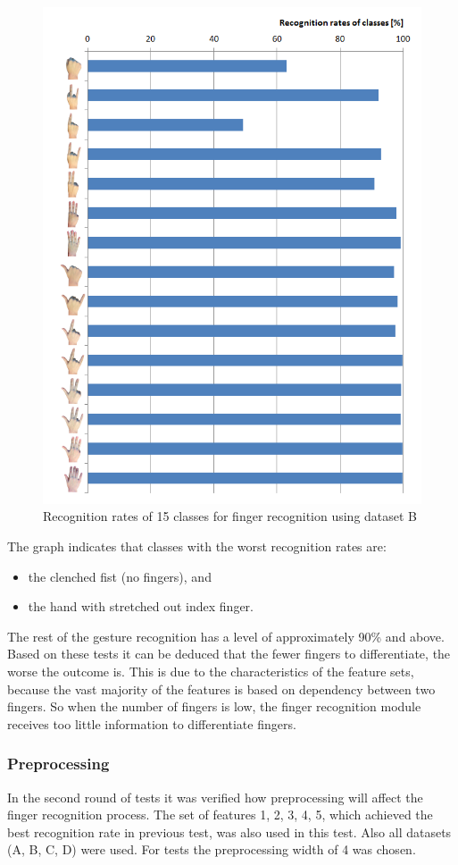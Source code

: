 \begin{figure}[htb]
\centering
 \includegraphics[width=0.75\columnwidth]{figures/classRateFD.png}
 \caption{Recognition rates of 15 classes for finger recognition using dataset B}
 \label{classRateFD}
\end{figure}

The graph indicates that classes with the worst recognition rates are:
\begin{itemize}
\item the clenched fist (no fingers), and
\item the hand with stretched out index finger.
\end{itemize}
The rest of the gesture recognition has a level of approximately 90\% and above. Based on these tests it can be deduced that the fewer fingers to differentiate, the worse the outcome is. This is due to the characteristics of the feature sets, because the vast majority of the features is based on dependency between two fingers. So when the number of fingers is low, the finger recognition module receives too little information to differentiate fingers.



\subsubsection{Preprocessing}
In the second round of tests it was verified how preprocessing will affect the finger recognition process. The set of features 1, 2, 3, 4, 5, which achieved the best recognition rate in previous test, was also used in this test. Also all datasets (A, B, C, D) were used. For tests the preprocessing width of 4 was chosen.


